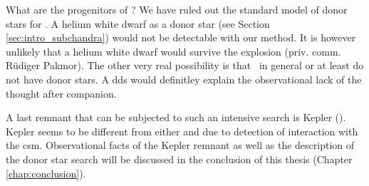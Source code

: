 What are the progenitors of \sneia? We have ruled out the standard model of donor stars for . A helium white dwarf as a donor star (see Section \ref{sec:intro_subchandra}) would not be detectable with our method. It is however unlikely that a helium white dwarf would survive the explosion (priv. comm. R\"udiger Pakmor). The other very real possibility is that \sneia\ in general or at least  do not have donor stars. A \gls{dds} would definitley explain the observational lack of the thought after companion. 

A last remnant that can be subjected to such an intensive search is Kepler (). Kepler seems to be different from either  and  due to detection of interaction with the \gls{csm}. Observational facts of the Kepler remnant  as well as the description of the donor star search will be discussed in the conclusion of this thesis (Chapter \ref{chap:conclusion}).

